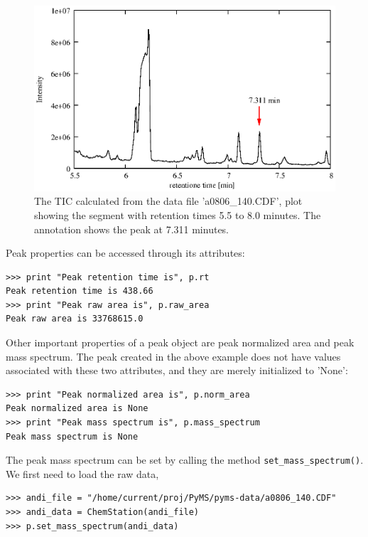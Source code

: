 \begin{figure}[htp]
\begin{center}
\includegraphics{graphics/tic_with_peak/tic_with_peak.eps}
\caption{The TIC calculated from the data file 'a0806\_140.CDF', plot showing the
segment with retention times 5.5 to 8.0 minutes. The annotation shows the peak at
7.311 minutes.}
\label{fig:mass-spectrum}
\end{center}
\end{figure}

Peak properties can be accessed through its attributes:

\begin{verbatim}
>>> print "Peak retention time is", p.rt
Peak retention time is 438.66
>>> print "Peak raw area is", p.raw_area
Peak raw area is 33768615.0
\end{verbatim}

\noindent
Other important properties of a peak object are peak normalized area
and peak mass spectrum. The peak created in the above example does
not have values associated with these two attributes, and they are
merely initialized to 'None':

\begin{verbatim}
>>> print "Peak normalized area is", p.norm_area
Peak normalized area is None
>>> print "Peak mass spectrum is", p.mass_spectrum
Peak mass spectrum is None
\end{verbatim}

\noindent
The peak mass spectrum can be set by calling the method {\tt set\_mass\_spectrum()}.
We first need to load the raw data,

\begin{verbatim}
>>> andi_file = "/home/current/proj/PyMS/pyms-data/a0806_140.CDF"
>>> andi_data = ChemStation(andi_file)
>>> p.set_mass_spectrum(andi_data)
\end{verbatim}

